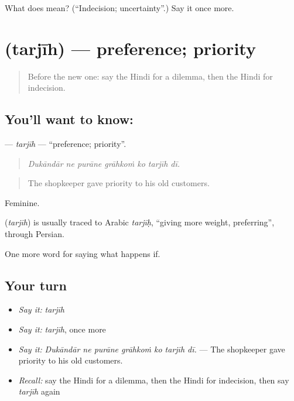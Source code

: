 \begin{tcolorbox}[breakable,colback=teal!4,colframe=teal!35!black,title={Before you move on}]
What does  mean? (\textquotedblleft{}Indecision; uncertainty\textquotedblright{}.) Say it once more.
\end{tcolorbox}
\section[\texorpdfstring{\hi{तरजीह} (tarjīh)}{तरजीह (tarjīh)}]{ (tarjīh) — preference; priority}

\label{lesson:HI-C549-tarjih}



\begin{quote}
Before the new one: say the Hindi for a dilemma, then the Hindi for indecision.
\end{quote}

\subsection*{You'll want to know: }
\textbf{} — \emph{tarjīh} — \textquotedblleft{}preference; priority\textquotedblright{}.

\begin{quote}
      
\end{quote}

\begin{quote}
\emph{Dukāndār ne purāne grāhkoṁ ko tarjīh dī.}
\end{quote}

\begin{quote}
The shopkeeper gave priority to his old customers.
\end{quote}

Feminine.

\begin{cousinweb}
\textbf{} (\emph{tarjīh}) is usually traced to Arabic \emph{tarjīḥ}, \textquotedblleft{}giving more weight, preferring\textquotedblright{}, through Persian.
\end{cousinweb}

\begin{grammarlens}[title={What you've built}]
One more word for saying what happens if.
\end{grammarlens}

\subsection*{Your turn}
\begin{itemize}
\raggedright
  \item \emph{Say it:} \emph{tarjīh}
  \item \emph{Say it:} \emph{tarjīh}, once more
  \item \emph{Say it:} \emph{Dukāndār ne purāne grāhkoṁ ko tarjīh dī.} — The shopkeeper gave priority to his old customers.
  \item \emph{Recall:} say the Hindi for a dilemma, then the Hindi for indecision, then say \emph{tarjīh} again
\end{itemize}

